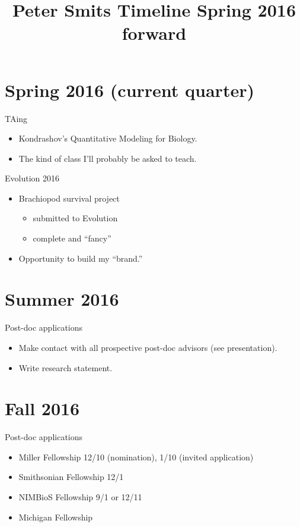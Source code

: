 \documentclass{article}
\title{Peter Smits Timeline Spring 2016 forward}
\date{}
\begin{document}
\linenumbers
\modulolinenumbers[2]

\maketitle

\section{Spring 2016 (current quarter)}
TAing 
\begin{itemize}
  \item Kondrashov's Quantitative Modeling for Biology.
  \item The kind of class I'll probably be asked to teach.
\end{itemize}

Evolution 2016
\begin{itemize}
  \item Brachiopod survival project
    \begin{itemize}
      \item submitted to Evolution
      \item complete and ``fancy''
    \end{itemize}
  \item Opportunity to build my ``brand.''
\end{itemize}


\section{Summer 2016}
Post-doc applications
\begin{itemize}
  \item Make contact with all prospective post-doc advisors (see presentation).
  \item Write research statement.
\end{itemize}


\section{Fall 2016}
Post-doc applications
\begin{itemize}
  \item Miller Fellowship 12/10 (nomination), 1/10 (invited application)
  \item Smithsonian Fellowship 12/1
  \item NIMBioS Fellowship 9/1 or 12/11
  \item Michigan Fellowship
\end{itemize}
\end{document}
